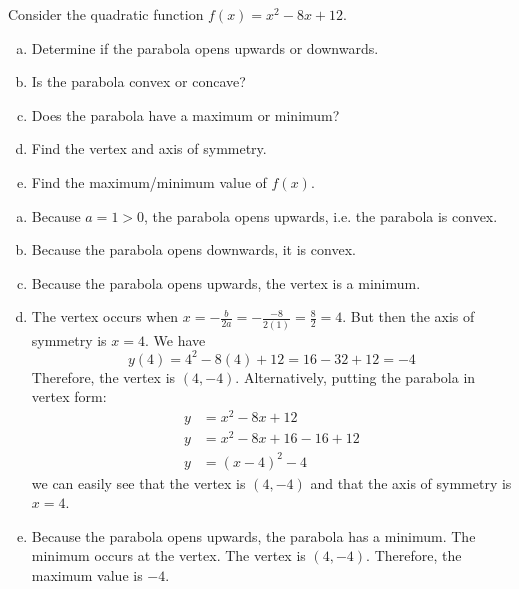 \documentclass[11pt,letterpaper]{article}
\begin{document}
\newpage





 Consider the quadratic function $f(x)= x^2 - 8x + 12$.
\begin{enumerate}[(a)]
\item Determine if the parabola opens upwards or downwards.
\item Is the parabola convex or concave?
\item Does the parabola have a maximum or minimum? 
\item Find the vertex and axis of symmetry. 
\item Find the maximum/minimum value of $f(x)$. 
\end{enumerate} \pspace

\sol
\begin{enumerate}[(a)]
\item Because $a= 1 > 0$, the parabola opens upwards, i.e. the parabola is convex. \pspace

\item Because the parabola opens downwards, it is convex. \pspace

\item Because the parabola opens upwards, the vertex is a minimum. \pspace

\item The vertex occurs when $x= -\frac{b}{2a}= -\frac{-8}{2(1)}= \frac{8}{2}= 4$. But then the axis of symmetry is $x= 4$. We have
	\[
	y(4)= 4^2 - 8(4) + 12= 16 - 32 + 12= -4
	\]
Therefore, the vertex is $(4, -4)$. Alternatively, putting the parabola in vertex form:
	\[
	\begin{aligned}
	y&= x^2 - 8x + 12 \\[0.3cm]
	y&= x^2 - 8x + 16 - 16 + 12 \\[0.3cm]
	y&= (x - 4)^2 - 4
	\end{aligned}
	\]
we can easily see that the vertex is $(4, -4)$ and that the axis of symmetry is $x= 4$. \pspace

\item Because the parabola opens upwards, the parabola has a minimum. The minimum occurs at the vertex. The vertex is $(4, -4)$. Therefore, the maximum value is $-4$. 
\end{enumerate}





\newpage
\end{document}
